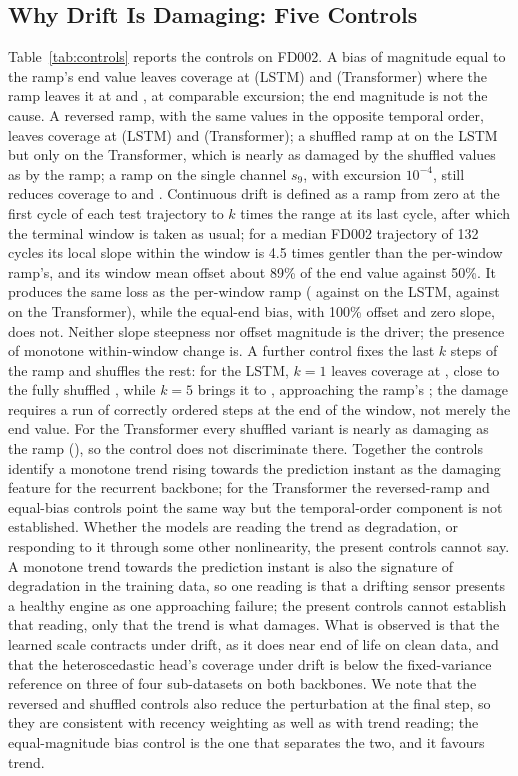 \documentclass[journal]{IEEEtran}
\begin{document}
\subsection{Why Drift Is Damaging: Five Controls}
Table~\ref{tab:controls} reports the controls on FD002. A bias of magnitude equal to the ramp's end value leaves coverage at \NBiasEqL{} (LSTM) and \NBiasEqT{} (Transformer) where the ramp leaves it at \NRampL{} and \NRampT, at comparable excursion; the end magnitude is not the cause. A reversed ramp, with the same values in the opposite temporal order, leaves coverage at \NRevL{} (LSTM) and \NRevT{} (Transformer); a shuffled ramp at \NShufL{} on the LSTM but only \NShufT{} on the Transformer, which is nearly as damaged by the shuffled values as by the ramp; a ramp on the single channel $s_9$, with excursion $10^{-4}$, still reduces coverage to \NSingleL{} and \NSingleT. Continuous drift is defined as a ramp from zero at the first cycle of each test trajectory to $k$ times the range at its last cycle, after which the terminal window is taken as usual; for a median FD002 trajectory of 132 cycles its local slope within the window is 4.5 times gentler than the per-window ramp's, and its window mean offset about 89\% of the end value against 50\%. It produces the same loss as the per-window ramp (\NContL{} against \NRampL{} on the LSTM, \NContT{} against \NRampT{} on the Transformer), while the equal-end bias, with 100\% offset and zero slope, does not. Neither slope steepness nor offset magnitude is the driver; the presence of monotone within-window change is. A further control fixes the last $k$ steps of the ramp and shuffles the rest: for the LSTM, $k=1$ leaves coverage at \NFixEndOneL, close to the fully shuffled \NShufL, while $k=5$ brings it to \NFixEndFiveL, approaching the ramp's \NRampL; the damage requires a run of correctly ordered steps at the end of the window, not merely the end value. For the Transformer every shuffled variant is nearly as damaging as the ramp (\NFixEndT), so the control does not discriminate there. Together the controls identify a monotone trend rising towards the prediction instant as the damaging feature for the recurrent backbone; for the Transformer the reversed-ramp and equal-bias controls point the same way but the temporal-order component is not established. Whether the models are reading the trend as degradation, or responding to it through some other nonlinearity, the present controls cannot say. A monotone trend towards the prediction instant is also the signature of degradation in the training data, so one reading is that a drifting sensor presents a healthy engine as one approaching failure; the present controls cannot establish that reading, only that the trend is what damages. What is observed is that the learned scale contracts under drift, as it does near end of life on clean data, and that the heteroscedastic head's coverage under drift is below the fixed-variance reference on three of four sub-datasets on both backbones. We note that the reversed and shuffled controls also reduce the perturbation at the final step, so they are consistent with recency weighting as well as with trend reading; the equal-magnitude bias control is the one that separates the two, and it favours trend.
\end{document}
